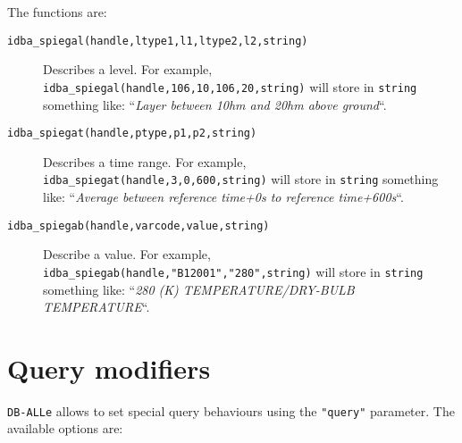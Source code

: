 \documentclass[final,12pt,a4paper,twoside]{book}
\newcommand{\dballe}{{\tt DB-ALLe}}
\begin{document}
The functions are:

\begin{description}
\item[{\tt idba\_spiegal(handle,ltype1,l1,ltype2,l2,string)}]
  Describes a level.  For example, {\tt idba\_spiegal(handle,106,10,106,20,string)}
  will store in {\tt string} something like: ``\emph{Layer between 10hm and
  20hm above ground}``.
\item[{\tt idba\_spiegat(handle,ptype,p1,p2,string)}]
  Describes a time range.  For example, {\tt idba\_spiegat(handle,3,0,600,string)}
  will store in {\tt string} something like: ``\emph{Average between reference
  time+0s to reference time+600s}``.
\item[{\tt idba\_spiegab(handle,varcode,value,string)}]
  Describe a value.  For example, {\tt idba\_spiegab(handle,"B12001","280",string)}
  will store in {\tt string} something like: ``\emph{280 (K)
  TEMPERATURE/DRY-BULB TEMPERATURE}``.
\end{description}

\section{Query modifiers}

\dballe{} allows to set special query behaviours using the {\tt "query"}
parameter.  The available options are:
\end{document}
